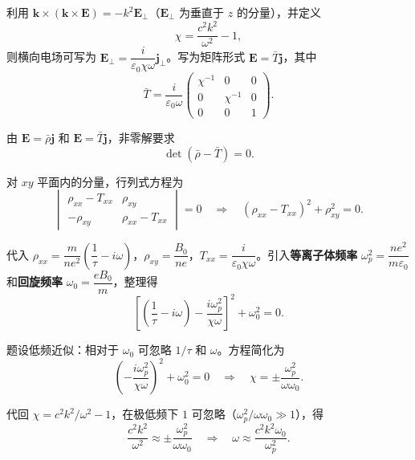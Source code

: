 \begin{derivationbox}[标准解题过程]
利用 $\bm{k}\times(\bm{k}\times\bm{E})=-k^2\bm{E}_\perp$（$\bm{E}_\perp$ 为垂直于 $z$ 的分量），并定义
\begin{equation}
\chi=\frac{c^2k^2}{\omega^2}-1,
\end{equation}
则横向电场可写为 $\bm{E}_\perp=\dfrac{i}{\varepsilon_0\chi\omega}\bm{j}_\perp$。写为矩阵形式 $\bm{E}=\bar{T}\bm{j}$，其中
\begin{equation}
\bar{T}=\frac{i}{\varepsilon_0\omega}\begin{pmatrix}\chi^{-1}&0&0\\0&\chi^{-1}&0\\0&0&1\end{pmatrix}.
\end{equation}

由 $\bm{E}=\bar{\rho}\bm{j}$ 和 $\bm{E}=\bar{T}\bm{j}$，非零解要求
\begin{equation}
\det(\bar{\rho}-\bar{T})=0.
\end{equation}

对 $xy$ 平面内的分量，行列式方程为
\begin{equation}
\begin{vmatrix}\rho_{xx}-T_{xx}&\rho_{xy}\\-\rho_{xy}&\rho_{xx}-T_{xx}\end{vmatrix}=0
\quad\Longrightarrow\quad
(\rho_{xx}-T_{xx})^2+\rho_{xy}^2=0.
\end{equation}

代入 $\rho_{xx}=\dfrac{m}{ne^2}\left(\dfrac{1}{\tau}-i\omega\right)$，$\rho_{xy}=\dfrac{B_0}{ne}$，$T_{xx}=\dfrac{i}{\varepsilon_0\chi\omega}$。引入\textbf{等离子体频率} $\omega_p^2=\dfrac{ne^2}{m\varepsilon_0}$ 和\textbf{回旋频率} $\omega_0=\dfrac{eB_0}{m}$，整理得
\begin{equation}
\left[\left(\frac{1}{\tau}-i\omega\right)-\frac{i\omega_p^2}{\chi\omega}\right]^2+\omega_0^2=0.
\end{equation}

题设低频近似：相对于 $\omega_0$ 可忽略 $1/\tau$ 和 $\omega$。方程简化为
\begin{equation}
\left(-\frac{i\omega_p^2}{\chi\omega}\right)^2+\omega_0^2=0
\quad\Longrightarrow\quad
\chi=\pm\frac{\omega_p^2}{\omega\omega_0}.
\end{equation}

代回 $\chi=c^2k^2/\omega^2-1$，在极低频下 $1$ 可忽略（$\omega_p^2/\omega\omega_0\gg1$），得
\begin{equation}
\frac{c^2k^2}{\omega^2}\approx\pm\frac{\omega_p^2}{\omega\omega_0}
\quad\Longrightarrow\quad
\boxed{\omega\approx\frac{c^2k^2\omega_0}{\omega_p^2}.}
\end{equation}
\end{derivationbox}


